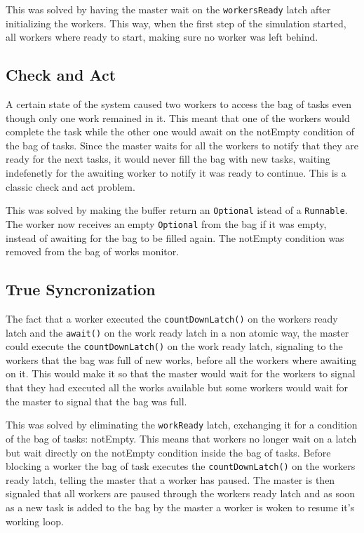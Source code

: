 \documentclass[12pt, a4paper]{report}
\begin{document}
This was solved by having the master wait on the \texttt{workersReady} latch after initializing
 the workers. This way, when the first step of the simulation started, all workers where
 ready to start, making sure no worker was left behind.

\subsection{Check and Act}
A certain state of the system caused two workers to access the bag of tasks even though
 only one work remained in it. This meant that one of the workers would complete the task
 while the other one would await on the notEmpty condition of the bag of tasks. Since the
 master waits for all the workers to notify that they are ready for the next tasks, it would
 never fill the bag with new tasks, waiting indefenetly for the awaiting worker to notify
 it was ready to continue. This is a classic check and act problem.
 
This was solved by making the buffer return an \texttt{Optional} istead of a \texttt{Runnable}. The worker
 now receives an empty \texttt{Optional} from the bag if it was empty, instead of awaiting for the
 bag to be filled again. The notEmpty condition was removed from the bag of works monitor.

\subsection{True Syncronization}
The fact that a worker executed the \texttt{countDownLatch()} on the workers
 ready latch and the \texttt{await()} on the work ready latch in a non atomic way,
 the master could execute the \texttt{countDownLatch()} on the work ready latch, signaling
 to the workers that the bag was full of new works, before
 all the workers where awaiting on it. This would make it so that the master would
 wait for the workers to signal that they had executed all the works available but
 some workers would wait for the master to signal that the bag was full.

This was solved by eliminating the \texttt{workReady} latch, exchanging it for a condition
 of the bag of tasks: notEmpty. This means that workers no longer wait on a latch
 but wait directly on the notEmpty condition inside the bag of tasks. Before blocking
 a worker the bag of task executes the \texttt{countDownLatch()} on the workers ready latch,
 telling the master that a worker has paused. The master is then signaled that all
 workers are paused through the workers ready latch and as soon as a new task is added
 to the bag by the master a worker is woken to resume it's working loop.
\end{document}
